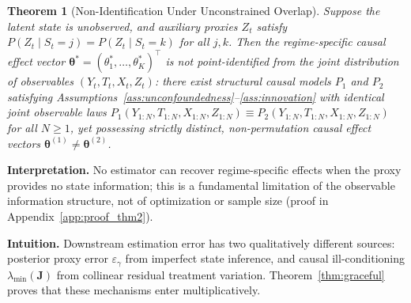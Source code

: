 \documentclass[twoside]{article}
\newtheorem{theorem}{Theorem}
\theoremstyle{definition}
\begin{document}
\begin{theorem}[Non-Identification Under Unconstrained Overlap]
\label{thm:impossibility}
Suppose the latent state is unobserved, and auxiliary proxies $Z_t$ satisfy $P(Z_t \mid S_t = j) = P(Z_t \mid S_t = k)$ for all $j, k$. Then the regime-specific causal effect vector $\boldsymbol{\theta}^* = (\theta_1^*, \dots, \theta_K^*)^\top$ is not point-identified from the joint distribution of observables $(Y_t, T_t, X_t, Z_t)$: there exist structural causal models $P_1$ and $P_2$ satisfying Assumptions~\ref{ass:unconfoundedness}--\ref{ass:innovation} with identical joint observable laws $P_1(Y_{1:N}, T_{1:N}, X_{1:N}, Z_{1:N}) \equiv P_2(Y_{1:N}, T_{1:N}, X_{1:N}, Z_{1:N})$ for all $N \ge 1$, yet possessing strictly distinct, non-permutation causal effect vectors $\boldsymbol{\theta}^{(1)} \neq \boldsymbol{\theta}^{(2)}$.
\end{theorem}
\textbf{Interpretation.} No estimator can recover regime-specific effects when the proxy provides no state information; this is a fundamental limitation of the observable information structure, not of optimization or sample size (proof in Appendix~\ref{app:proof_thm2}).

\textbf{Intuition.} Downstream estimation error has two qualitatively different sources: posterior proxy error $\varepsilon_\gamma$ from imperfect state inference, and causal ill-conditioning $\lambda_{\min}(\boldsymbol{J})$ from collinear residual treatment variation. Theorem~\ref{thm:graceful} proves that these mechanisms enter multiplicatively.
\end{document}
